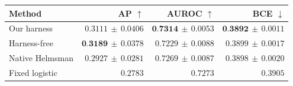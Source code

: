 \centering\small\setlength{\tabcolsep}{4pt}\renewcommand{\arraystretch}{1.10}
\begin{tabularx}{\linewidth}{@{}Xrrr@{}}
\toprule
Method & AP $\uparrow$ & AUROC $\uparrow$ & BCE $\downarrow$ \\
\midrule
Our harness & $0.3111\,\pm\,0.0406$ & $\textbf{0.7314}\,\pm\,0.0053$ & $\textbf{0.3892}\,\pm\,0.0011$ \\
Harness-free & $\textbf{0.3189}\,\pm\,0.0378$ & $0.7229\,\pm\,0.0088$ & $0.3899\,\pm\,0.0017$ \\
Native Helmsman & $0.2927\,\pm\,0.0281$ & $0.7269\,\pm\,0.0087$ & $0.3898\,\pm\,0.0020$ \\
Fixed logistic & $0.2783$ & $0.7273$ & $0.3905$ \\
\bottomrule
\end{tabularx}
\caption{Training-only CV: mean $\pm$ sample SD over eight trajectories/controller, with identical 491 training rows, ten simulated clients and three folds. \textbf{Bold}: best column mean (display ties included). The single fixed reference has no seed SD. Helmsman retains its first-valid-execution stop. All 24 selections, 25 final labels and costs: Appendix O.}
\label{tab:federated-cv-v2}
